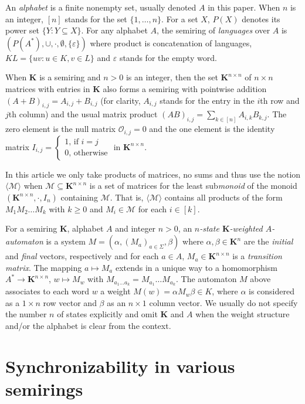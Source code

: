 \documentclass[submission,copyright,creativecommons]{eptcs}
\def\bK{{\mathbf{K}}}
\theoremstyle{plain}
\theoremstyle{definition}
\theoremstyle{remark}
\begin{document}
An \emph{alphabet} is a finite nonempty set, usually denoted $A$ in this paper.
When $n$ is an integer, $[n]$ stands for the set $\{1,\ldots,n\}$.
For a set $X$, $P(X)$ denotes its power set $\{Y:Y\subseteq X\}$.
For any alphabet $A$, the semiring of \emph{languages} over $A$ is $(P(A^*),\cup,\cdot,\emptyset,\{\varepsilon\})$ where
product is concatenation of languages, $KL=\{uv:u\in K,v\in L\}$ and $\varepsilon$ stands for the empty word.

When $\bK$ is a semiring and $n>0$ is an integer, then the set $\bK^{n\times n}$ of $n\times n$ matrices with entries in $\bK$
also forms a semiring with pointwise addition $(A+B)_{i,j}=A_{i,j}+B_{i,j}$ (for clarity, $A_{i,j}$ stands for the entry in the
$i$th row and $j$th column)
and the usual matrix product $(AB)_{i,j}=\sum_{k\in[n]}A_{i,k}B_{k,j}$.
The zero element is the null matrix $\mathcal{O}_{i,j}=0$
and the one element is the identity matrix $I_{i,j}=\begin{cases}1\textrm{, if }i=j\\0\textrm{, otherwise}\end{cases}$ in $\bK^{n\times n}$.

In this article we only take products of matrices, no sums and thus use the notion $\langle \mathcal{M}\rangle$ when
$\mathcal{M}\subseteq\bK^{n\times n}$ is a set of matrices for the least sub\emph{monoid} of the monoid $(\bK^{n\times n},\cdot,I_{n})$
containing $\mathcal{M}$. That is, $\langle\mathcal{M}\rangle$ contains all products of the form $M_1M_2\ldots M_k$ with
$k\geq 0$ and $M_i\in\mathcal{M}$ for each $i\in[k]$.

For a semiring $\bK$, alphabet $A$ and integer $n>0$, an \emph{$n$-state $\bK$-weighted $A$-automaton}
is a system $M=(\alpha,(M_a)_{a\in\Sigma},\beta)$
where $\alpha,\beta\in\bK^n$ are the \emph{initial} and \emph{final} vectors, respectively and for each $a\in A$,
$M_a\in \bK^{n\times n}$ is a \emph{transition matrix}. The mapping $a\mapsto M_a$ extends in a unique way to a homomorphism
$A^*\to \bK^{n\times n}$, $w\mapsto M_w$ with $M_{a_1\ldots a_k}=M_{a_1}\ldots M_{a_k}$. The automaton $M$ above associates to
each word $w$ a weight $M(w)=\alpha M_w\beta\in K$, where $\alpha$ is considered as a $1\times n$ row vector and $\beta$ as an
$n\times 1$ column vector. We usually do not specify the number $n$ of states explicitly and omit $\bK$ and $A$ when
the weight structure and/or the alphabet is clear from the context.

\section{Synchronizability in various semirings}
\end{document}
